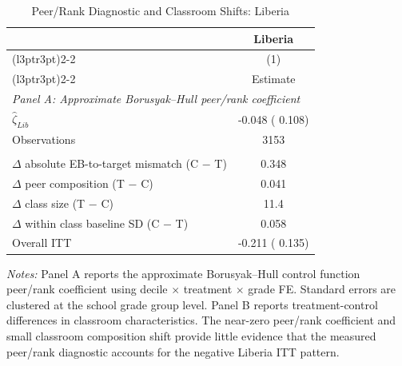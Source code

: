 \begin{table}[H]
\centering
\caption{Peer/Rank Diagnostic and Classroom Shifts: Liberia}
\label{tab:suffstat_liberia}
\begin{threeparttable}
\begin{tabular}[t]{lc}
\toprule
\multicolumn{1}{c}{ } & \multicolumn{1}{c}{Liberia} \\
\cmidrule(l{3pt}r{3pt}){2-2}
\multicolumn{1}{c}{ } & \multicolumn{1}{c}{(1)} \\
\cmidrule(l{3pt}r{3pt}){2-2}
 & Estimate \\
\midrule
\multicolumn{2}{l}{\textit{Panel A: Approximate Borusyak--Hull peer/rank coefficient}} \\
$\hat{\zeta}_{Lib}$ &  -0.048 (  0.108) \\
Observations & 3153 \\
\addlinespace
\multicolumn{2}{l}{\textit{Panel B: Treatment-induced classroom shifts}} \\
$\Delta$ absolute EB-to-target mismatch (C $-$ T) &   0.348 \\
$\Delta$ peer composition (T $-$ C) &   0.041 \\
$\Delta$ class size (T $-$ C) &    11.4 \\
$\Delta$ within class baseline SD (C $-$ T) &   0.058 \\
\addlinespace
Overall ITT &  -0.211 (  0.135) \\
\bottomrule
\end{tabular}
\begin{tablenotes}
\footnotesize
\item \textit{Notes:} Panel A reports the approximate Borusyak--Hull control function peer/rank coefficient using decile $\times$ treatment $\times$ grade FE\@. Standard errors are clustered at the school grade group level. Panel B reports treatment-control differences in classroom characteristics. The near-zero peer/rank coefficient and small classroom composition shift provide little evidence that the measured peer/rank diagnostic accounts for the negative Liberia ITT pattern.
\end{tablenotes}
\end{threeparttable}
\end{table}
